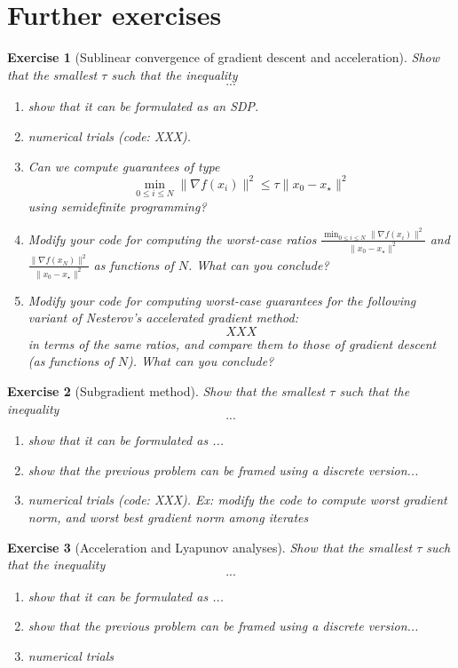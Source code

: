 \documentclass[11pt,a4paper]{article}
\newtheorem{exercise}{Exercise}
\begin{document}
	\section{Further exercises}\label{s:furtherex}		%
	
	\begin{exercise}[Sublinear convergence of gradient descent and acceleration]
	Show that the smallest $\tau$ such that the inequality
	\[ ... \]
	\begin{enumerate}
	\item show that it can be formulated as an SDP.
	\item numerical trials (code: XXX).
	\item Can we compute guarantees of type 
	\[ \min_{0\leqslant i\leqslant N} \|\nabla f(x_i)\|^2\leqslant \tau \|x_0-x_\star\|^2\]
	using semidefinite programming?
	\item Modify your code for computing the worst-case ratios $\frac{\min_{0\leqslant i\leqslant N}\|\nabla f(x_i)\|^2}{\|x_0-x_\star\|^2}$ and $\frac{\|\nabla f(x_N)\|^2}{\|x_0-x_\star\|^2}$ as functions of $N$. What can you conclude?
	\item Modify your code for computing worst-case guarantees for the following variant of Nesterov's accelerated gradient method:
	\begin{equation*}
	XXX
	\end{equation*}
	in terms of the same ratios, and compare them to those of gradient descent (as functions of $N$). What can you conclude?
	\end{enumerate}
	\end{exercise}
	
\begin{exercise}[Subgradient method]
	Show that the smallest $\tau$ such that the inequality
	\[ ... \]
	\begin{enumerate}
	\item show that it can be formulated as ...
	\item show that the previous problem can be framed using a discrete version...
	\item numerical trials (code: XXX). Ex: modify the code to compute worst gradient norm, and worst best gradient norm among iterates
	\end{enumerate}
	\end{exercise}
	
	
	\begin{exercise}[Acceleration and Lyapunov analyses]
	Show that the smallest $\tau$ such that the inequality
	\[ ... \]
	\begin{enumerate}
	\item show that it can be formulated as ...
	\item show that the previous problem can be framed using a discrete version...
	\item numerical trials
	\end{enumerate}
	\end{exercise}
	
\end{document}
